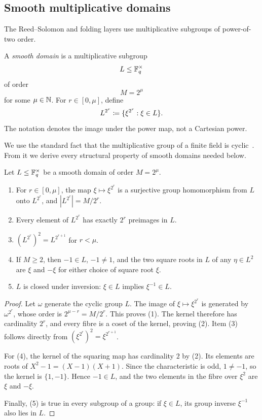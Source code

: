 \subsection{Smooth multiplicative domains}
\label{sec:preliminaries-domains}

The Reed--Solomon and folding layers use multiplicative subgroups of power-of-two order.

\begin{definition}
\label{def:smooth-domain}
A \emph{smooth domain} is a multiplicative subgroup
\[
  L\le\mathbb{F}_q^\times
\]
of order
\[
  M=2^\mu
\]
for some $\mu\in\mathbb{N}$.  For $r\in[0,\mu]$, define
\[
  L^{2^r}\coloneqq\{\xi^{2^r}:\xi\in L\}.
\]
The notation denotes the image under the power map, not a Cartesian power.
\end{definition}

We use the standard fact that the multiplicative group of a finite field is cyclic~\cite{LidlNiederreiter97}.  From it we derive every structural property of smooth domains needed below.

\begin{lemma}
\label{lem:power-maps}
Let $L\le\mathbb{F}_q^\times$ be a smooth domain of order $M=2^\mu$.
\begin{enumerate}[label=(\arabic*),leftmargin=*]
  \item For $r\in[0,\mu]$, the map $\xi\mapsto\xi^{2^r}$ is a surjective group homomorphism from $L$ onto $L^{2^r}$, and $|L^{2^r}|=M/2^r$.
  \item Every element of $L^{2^r}$ has exactly $2^r$ preimages in $L$.
  \item $(L^{2^r})^2=L^{2^{r+1}}$ for $r<\mu$.
  \item If $M\ge2$, then $-1\in L$, $-1\ne1$, and the two square roots in $L$ of any $\eta\in L^2$ are $\xi$ and $-\xi$ for either choice of square root $\xi$.
  \item $L$ is closed under inversion: $\xi\in L$ implies $\xi^{-1}\in L$.
\end{enumerate}
\end{lemma}

\begin{proof}
Let $\omega$ generate the cyclic group $L$.  The image of $\xi\mapsto\xi^{2^r}$ is generated by $\omega^{2^r}$, whose order is $2^{\mu-r}=M/2^r$.  This proves (1).  The kernel therefore has cardinality $2^r$, and every fibre is a coset of the kernel, proving (2).  Item (3) follows directly from $(\xi^{2^r})^2=\xi^{2^{r+1}}$.

For (4), the kernel of the squaring map has cardinality $2$ by (2).  Its elements are roots of $X^2-1=(X-1)(X+1)$.  Since the characteristic is odd, $1\ne-1$, so the kernel is $\{1,-1\}$.  Hence $-1\in L$, and the two elements in the fibre over $\xi^2$ are $\xi$ and $-\xi$.

Finally, (5) is true in every subgroup of a group: if $\xi\in L$, its group inverse $\xi^{-1}$ also lies in $L$.
\end{proof}

